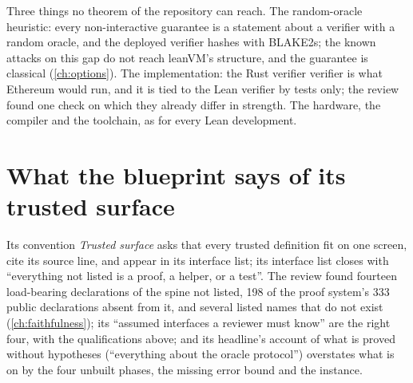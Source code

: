 Three things no theorem of the repository can reach. The random-oracle heuristic: every
non-interactive guarantee is a statement about a verifier with a random oracle, and the
deployed verifier hashes with BLAKE2s; the known attacks on this gap do not reach leanVM's
structure, and the guarantee is classical (\cref{ch:options}). The implementation: the Rust verifier
verifier is what Ethereum would run, and it is tied to the Lean verifier by tests only; the
review found one check on which they already differ in strength. The hardware, the compiler and the
toolchain, as for every Lean development.

\section{What the blueprint says of its trusted surface}

Its convention \emph{Trusted surface} asks that every trusted definition fit on one screen,
cite its source line, and appear in its interface list; its interface list closes with
\enquote{everything not listed is a proof, a helper, or a test}. The review found fourteen
load-bearing declarations of the spine not listed, 198 of the proof system's 333 public
declarations absent from it, and several listed names that do not exist
(\cref{ch:faithfulness}); its \enquote{assumed interfaces a reviewer must know} are the right
four, with the qualifications above; and its headline's account of what is proved without
hypotheses (\enquote{everything about the oracle protocol}) overstates what is on 
by the four unbuilt phases, the missing error bound and the instance.
